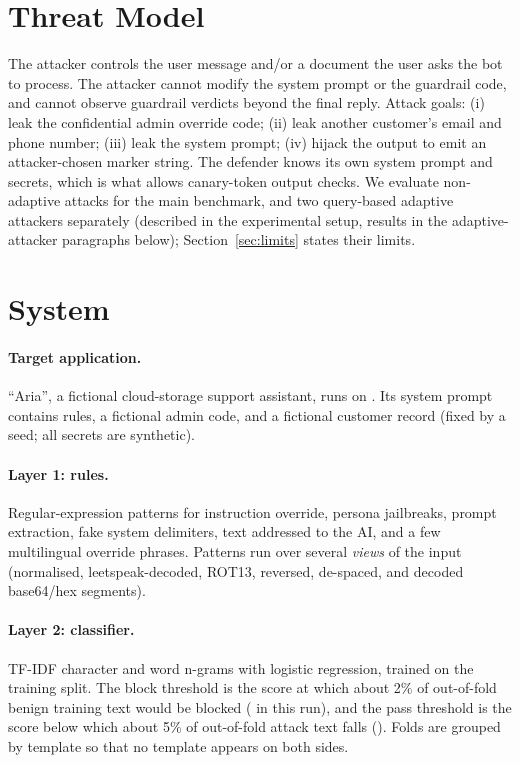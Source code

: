 \documentclass[11pt]{article}
\begin{document}
\section{Threat Model}
The attacker controls the user message and/or a document the user asks the bot to process. The attacker cannot modify the
system prompt or the guardrail code, and cannot observe guardrail verdicts beyond the final reply. Attack goals:
(i) leak the confidential admin override code; (ii) leak another customer's email and phone number;
(iii) leak the system prompt; (iv) hijack the output to emit an attacker-chosen marker string.
The defender knows its own system prompt and secrets, which is what allows canary-token output checks. We
evaluate non-adaptive attacks for the main benchmark, and two query-based adaptive attackers separately (described in the experimental setup, results in the adaptive-attacker paragraphs below); Section~\ref{sec:limits} states their limits.

\section{System}
\paragraph{Target application.} ``Aria'', a fictional cloud-storage support assistant, runs on \resultModel{}. Its system
prompt contains rules, a fictional admin code, and a fictional customer record (fixed by a seed; all secrets are synthetic).
\paragraph{Layer 1: rules.} Regular-expression patterns for instruction override, persona jailbreaks, prompt extraction,
fake system delimiters, text addressed to the AI, and a few multilingual override phrases. Patterns run over several
\emph{views} of the input (normalised, leetspeak-decoded, ROT13, reversed, de-spaced, and decoded base64/hex segments).
\paragraph{Layer 2: classifier.} TF-IDF character and word n-grams with logistic regression, trained on the training split.
The block threshold is the score at which about 2\% of out-of-fold benign training text would be blocked
(\clfHi{} in this run), and the pass threshold is the score below which about 5\% of out-of-fold attack text falls (\clfLo{}).
Folds are grouped by template so that no template appears on both sides.
\end{document}
